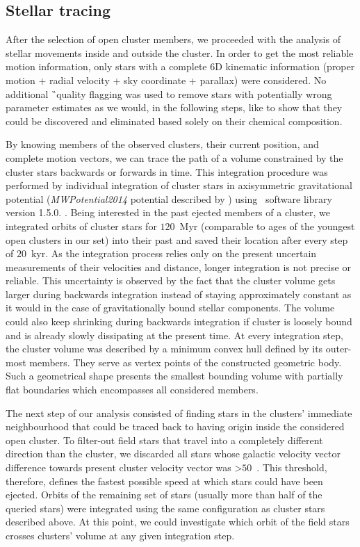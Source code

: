 \subsection{Stellar tracing}
\label{sec:orbit_tracing}
After the selection of open cluster members, we proceeded with the analysis of stellar movements inside and outside the cluster. In order to get the most reliable motion information, only stars with a complete 6D kinematic information (proper motion + radial velocity + sky coordinate + parallax) were considered. No additional \G\ quality flagging was used to remove stars with potentially wrong parameter estimates as we would, in the following steps, like to show that they could be discovered and eliminated based solely on their chemical composition.

By knowing members of the observed clusters, their current position, and complete motion vectors, we can trace the path of a volume constrained by the cluster stars backwards or forwards in time. This integration procedure was performed by individual integration of cluster stars in axisymmetric gravitational potential (\textit{MWPotential2014} potential described by \citet{2015ApJS..216...29B}) using \GP\ software library version 1.5.0. \cite{2015ApJS..216...29B}. Being interested in the past ejected members of a cluster, we integrated orbits of cluster stars for $120$~Myr (comparable to ages of the youngest open clusters in our set) into their past and saved their location after every step of $20$~kyr. As the integration process relies only on the present uncertain measurements of their velocities and distance, longer integration is not precise or reliable. This uncertainty is observed by the fact that the cluster volume gets larger during backwards integration instead of staying approximately constant as it would in the case of gravitationally bound stellar components. The volume could also keep shrinking during backwards integration if cluster is loosely bound and is already slowly dissipating at the present time. At every integration step, the cluster volume was described by a minimum convex hull defined by its outer-most members. They serve as vertex points of the constructed geometric body. Such a geometrical shape presents the smallest bounding volume with partially flat boundaries which encompasses all considered members.

The next step of our analysis consisted of finding stars in the clusters' immediate neighbourhood that could be traced back to having origin inside the considered open cluster. To filter-out field stars that travel into a completely different direction than the cluster, we discarded all stars whose galactic velocity vector difference towards present cluster velocity vector was >$50$~\kms. This threshold, therefore, defines the fastest possible speed at which stars could have been ejected. Orbits of the remaining set of stars (usually more than half of the queried stars) were integrated using the same configuration as cluster stars described above. At this point, we could investigate which orbit of the field stars crosses clusters' volume at any given integration step.


